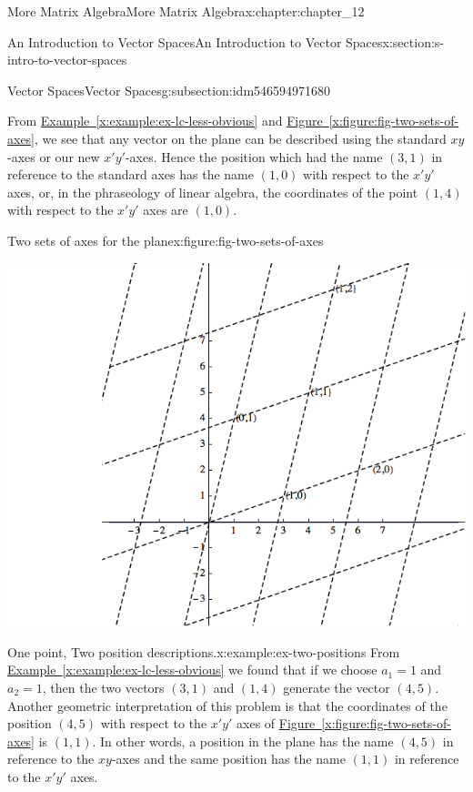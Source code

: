 \documentclass[oneside,10pt,]{book}
\newcommand{\xreffont}{\relax}
\numberwithin{equation}{section}
\begin{document}
\begin{chapterptx}{More Matrix Algebra}{}{More Matrix Algebra}{}{}{x:chapter:chapter_12}
\begin{sectionptx}{An Introduction to Vector Spaces}{}{An Introduction to Vector Spaces}{}{}{x:section:s-intro-to-vector-spaces}
\begin{subsectionptx}{Vector Spaces}{}{Vector Spaces}{}{}{g:subsection:idm546594971680}
\par
From \hyperref[x:example:ex-lc-less-obvious]{Example~{\xreffont\ref{x:example:ex-lc-less-obvious}}}  and \hyperref[x:figure:fig-two-sets-of-axes]{Figure~{\xreffont\ref{x:figure:fig-two-sets-of-axes}}}, we see that any vector on the plane can be described using the standard \(xy\)-axes or our new \(x'y'\)-axes. Hence the position which had the name \((3,1)\) in reference to the standard axes has the name \((1,0)\) with respect to the \(x'y'\) axes, or, in the phraseology of linear algebra, the coordinates of the point \((1,4)\) with respect to the \(x'y'\) axes are \((1, 0)\).%
\begin{figureptx}{Two sets of axes for the plane}{x:figure:fig-two-sets-of-axes}{}%
\begin{image}{0.15}{0.7}{0.15}%
\includegraphics[width=\linewidth]{images/fig-two-sets-of-axes.png}
\end{image}%
\tcblower
\end{figureptx}%
\begin{example}{One point, Two position descriptions.}{x:example:ex-two-positions}%
From \hyperref[x:example:ex-lc-less-obvious]{Example~{\xreffont\ref{x:example:ex-lc-less-obvious}}} we found that if we choose \(a_1=1\) and \(a_2=1\), then the two vectors \((3, 1)\) and \((1,4)\) generate the vector \((4,5)\). Another geometric interpretation of this problem is that the coordinates of the position \((4,5)\) with respect to the \(x'y'\) axes of \hyperref[x:figure:fig-two-sets-of-axes]{Figure~{\xreffont\ref{x:figure:fig-two-sets-of-axes}}} is \((1, 1)\). In other words, a position in the plane has the name \((4,5)\) in reference to the \(xy\)-axes and the same position has the name \((1, 1)\) in reference to the \(x'y'\) axes.%

\end{example}
\end{subsectionptx}
\end{sectionptx}
\end{chapterptx}
\end{document}
